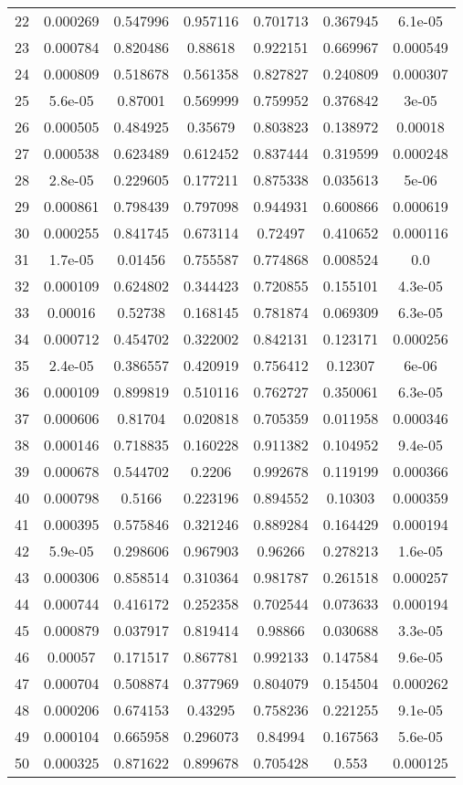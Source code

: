 \begin{table}
\begin{tabular}{c|c|c|c|c|c|c}
22 & 0.000269 & 0.547996 & 0.957116 & 0.701713 & 0.367945 & 6.1e-05\\
23 & 0.000784 & 0.820486 & 0.88618 & 0.922151 & 0.669967 & 0.000549\\
24 & 0.000809 & 0.518678 & 0.561358 & 0.827827 & 0.240809 & 0.000307\\
25 & 5.6e-05 & 0.87001 & 0.569999 & 0.759952 & 0.376842 & 3e-05\\
26 & 0.000505 & 0.484925 & 0.35679 & 0.803823 & 0.138972 & 0.00018\\
27 & 0.000538 & 0.623489 & 0.612452 & 0.837444 & 0.319599 & 0.000248\\
28 & 2.8e-05 & 0.229605 & 0.177211 & 0.875338 & 0.035613 & 5e-06\\
29 & 0.000861 & 0.798439 & 0.797098 & 0.944931 & 0.600866 & 0.000619\\
30 & 0.000255 & 0.841745 & 0.673114 & 0.72497 & 0.410652 & 0.000116\\
31 & 1.7e-05 & 0.01456 & 0.755587 & 0.774868 & 0.008524 & 0.0\\
32 & 0.000109 & 0.624802 & 0.344423 & 0.720855 & 0.155101 & 4.3e-05\\
33 & 0.00016 & 0.52738 & 0.168145 & 0.781874 & 0.069309 & 6.3e-05\\
34 & 0.000712 & 0.454702 & 0.322002 & 0.842131 & 0.123171 & 0.000256\\
35 & 2.4e-05 & 0.386557 & 0.420919 & 0.756412 & 0.12307 & 6e-06\\
36 & 0.000109 & 0.899819 & 0.510116 & 0.762727 & 0.350061 & 6.3e-05\\
37 & 0.000606 & 0.81704 & 0.020818 & 0.705359 & 0.011958 & 0.000346\\
38 & 0.000146 & 0.718835 & 0.160228 & 0.911382 & 0.104952 & 9.4e-05\\
39 & 0.000678 & 0.544702 & 0.2206 & 0.992678 & 0.119199 & 0.000366\\
40 & 0.000798 & 0.5166 & 0.223196 & 0.894552 & 0.10303 & 0.000359\\
41 & 0.000395 & 0.575846 & 0.321246 & 0.889284 & 0.164429 & 0.000194\\
42 & 5.9e-05 & 0.298606 & 0.967903 & 0.96266 & 0.278213 & 1.6e-05\\
43 & 0.000306 & 0.858514 & 0.310364 & 0.981787 & 0.261518 & 0.000257\\
44 & 0.000744 & 0.416172 & 0.252358 & 0.702544 & 0.073633 & 0.000194\\
45 & 0.000879 & 0.037917 & 0.819414 & 0.98866 & 0.030688 & 3.3e-05\\
46 & 0.00057 & 0.171517 & 0.867781 & 0.992133 & 0.147584 & 9.6e-05\\
47 & 0.000704 & 0.508874 & 0.377969 & 0.804079 & 0.154504 & 0.000262\\
48 & 0.000206 & 0.674153 & 0.43295 & 0.758236 & 0.221255 & 9.1e-05\\
49 & 0.000104 & 0.665958 & 0.296073 & 0.84994 & 0.167563 & 5.6e-05\\
50 & 0.000325 & 0.871622 & 0.899678 & 0.705428 & 0.553 & 0.000125\\
\end{tabular}
\end{table}
